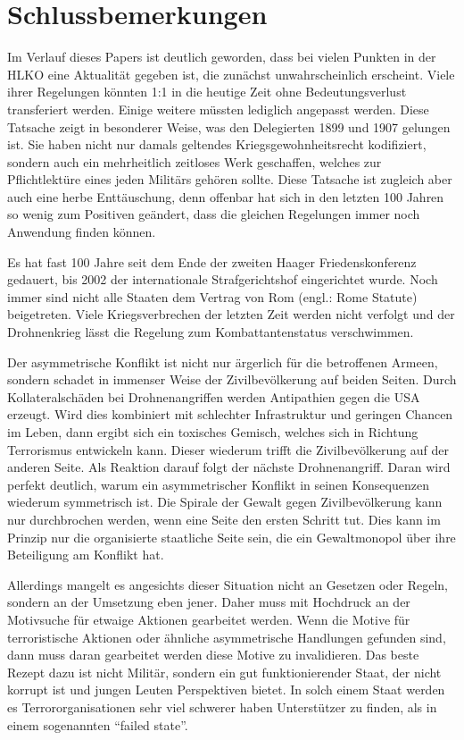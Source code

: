 \documentclass[12pt]{scrartcl}
\begin{document}
\section{Schlussbemerkungen}
Im Verlauf dieses Papers ist deutlich geworden, dass bei vielen Punkten in der HLKO eine Aktualität gegeben ist, die zunächst unwahrscheinlich erscheint. Viele ihrer Regelungen könnten 1:1 in die heutige Zeit ohne Bedeutungsverlust transferiert werden. Einige weitere müssten lediglich angepasst werden. Diese Tatsache zeigt in besonderer Weise, was den Delegierten 1899 und 1907 gelungen ist. Sie haben nicht nur damals geltendes Kriegsgewohnheitsrecht kodifiziert, sondern auch ein mehrheitlich zeitloses Werk geschaffen, welches zur Pflichtlektüre eines jeden Militärs gehören sollte. Diese Tatsache ist zugleich aber auch eine herbe Enttäuschung, denn offenbar hat sich in den letzten 100 Jahren so wenig zum Positiven geändert, dass die gleichen Regelungen immer noch Anwendung finden können.

Es hat fast 100 Jahre seit dem Ende der zweiten Haager Friedenskonferenz gedauert, bis 2002 der internationale Strafgerichtshof eingerichtet wurde. Noch immer sind nicht alle Staaten dem Vertrag von Rom (engl.: Rome Statute) beigetreten. Viele Kriegsverbrechen der letzten Zeit werden nicht verfolgt und der Drohnenkrieg lässt die Regelung zum Kombattantenstatus verschwimmen.

Der asymmetrische Konflikt ist nicht nur ärgerlich für die betroffenen Armeen, sondern schadet in immenser Weise der Zivilbevölkerung auf beiden Seiten. Durch Kollateralschäden bei Drohnenangriffen werden Antipathien gegen die USA erzeugt. Wird dies kombiniert mit schlechter Infrastruktur und geringen Chancen im Leben, dann ergibt sich ein toxisches Gemisch, welches sich in Richtung Terrorismus entwickeln kann. Dieser wiederum trifft die Zivilbevölkerung auf der anderen Seite. Als Reaktion darauf folgt der nächste Drohnenangriff. Daran wird perfekt deutlich, warum ein asymmetrischer Konflikt in seinen Konsequenzen wiederum symmetrisch ist. Die Spirale der Gewalt gegen Zivilbevölkerung kann nur durchbrochen werden, wenn eine Seite den ersten Schritt tut. Dies kann im Prinzip nur die organisierte staatliche Seite sein, die ein Gewaltmonopol über ihre Beteiligung am Konflikt hat.

Allerdings mangelt es angesichts dieser Situation nicht an Gesetzen oder Regeln, sondern an der Umsetzung eben jener. Daher muss mit Hochdruck an der Motivsuche für etwaige Aktionen gearbeitet werden. Wenn die Motive für terroristische Aktionen oder ähnliche asymmetrische Handlungen gefunden sind, dann muss daran gearbeitet werden diese Motive zu invalidieren. Das beste Rezept dazu ist nicht Militär, sondern ein gut funktionierender Staat, der nicht korrupt ist und jungen Leuten Perspektiven bietet. In solch einem Staat werden es Terrororganisationen sehr viel schwerer haben Unterstützer zu finden, als in einem sogenannten "`failed state"'.
\end{document}
